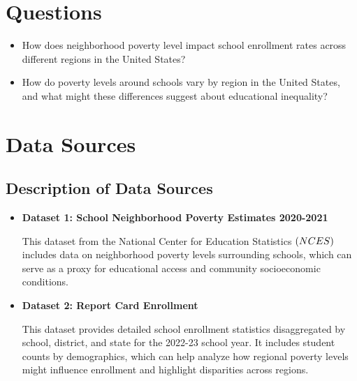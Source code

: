 \documentclass[a4paper,11pt]{article}
\begin{document}
\section{Questions}
\begin{itemize}
    \item How does neighborhood poverty level impact school enrollment rates across different regions in the United States?
    
    \item How do poverty levels around schools vary by region in the United States, and what might these differences suggest about educational inequality?
\end{itemize}

\section{Data Sources}
    \subsection{Description of Data Sources}
    \begin{itemize}
    \item \textbf{Dataset 1: School Neighborhood Poverty Estimates 2020-2021}
    
    This dataset from the National Center for Education Statistics \(\text(NCES)\) includes data on neighborhood poverty levels surrounding schools, which can serve as a proxy for educational access and community socioeconomic conditions. \cite{dataset1}

    \item \textbf{Dataset 2: Report Card Enrollment}

    This dataset provides detailed school enrollment statistics disaggregated by school, district, and state for the 2022-23 school year. It includes student counts by demographics, which can help analyze how regional poverty levels might influence enrollment and highlight disparities across regions. \cite{dataset2}
    \end{itemize}
\end{document}
